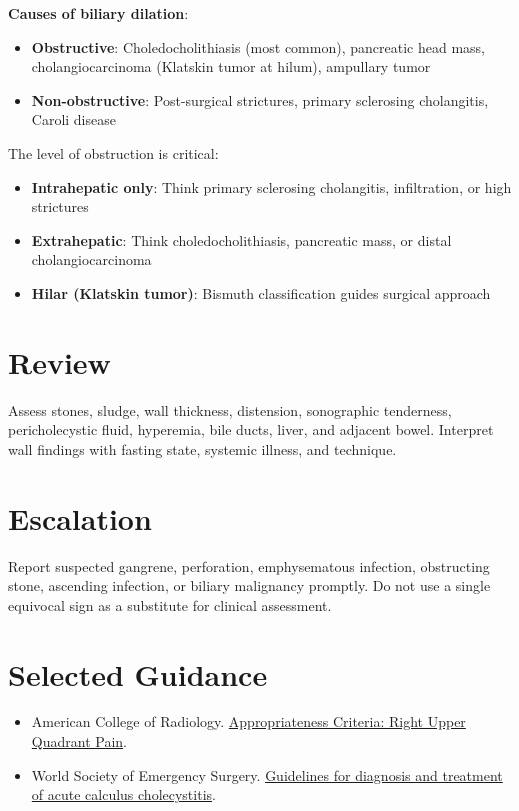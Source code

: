 \textbf{Causes of biliary dilation}:
\begin{itemize}
  \item \textbf{Obstructive}: Choledocholithiasis (most common), pancreatic head mass, cholangiocarcinoma (Klatskin tumor at hilum), ampullary tumor
  \item \textbf{Non-obstructive}: Post-surgical strictures, primary sclerosing cholangitis, Caroli disease
\end{itemize}

The level of obstruction is critical:
\begin{itemize}
  \item \textbf{Intrahepatic only}: Think primary sclerosing cholangitis, infiltration, or high strictures
  \item \textbf{Extrahepatic}: Think choledocholithiasis, pancreatic mass, or distal cholangiocarcinoma
  \item \textbf{Hilar (Klatskin tumor)}: Bismuth classification guides surgical approach
\end{itemize}


\section{Review}
Assess stones, sludge, wall thickness, distension, sonographic tenderness, pericholecystic fluid, hyperemia, bile ducts, liver, and adjacent bowel. Interpret wall findings with fasting state, systemic illness, and technique.

\section{Escalation}
Report suspected gangrene, perforation, emphysematous infection, obstructing stone, ascending infection, or biliary malignancy promptly. Do not use a single equivocal sign as a substitute for clinical assessment.

\section*{Selected Guidance}
\begin{itemize}
    \item American College of Radiology. \href{https://acsearch.acr.org/docs/69474/Narrative/}{Appropriateness Criteria: Right Upper Quadrant Pain}.
    \item World Society of Emergency Surgery. \href{https://pmc.ncbi.nlm.nih.gov/articles/PMC7643471/}{Guidelines for diagnosis and treatment of acute calculus cholecystitis}.
\end{itemize}

\clearpage
